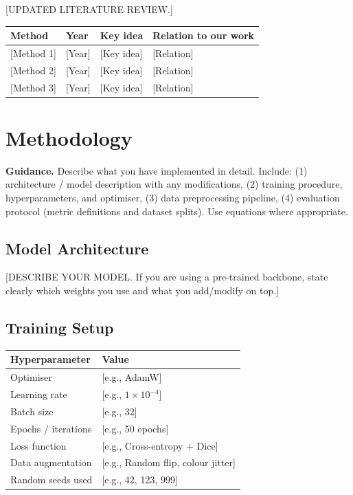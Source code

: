 \documentclass[11pt, letterpaper]{article}
\begin{document}
[UPDATED LITERATURE REVIEW.]

\begin{center}
\begin{tabular}{llp{4cm}p{4cm}}
\toprule
\textbf{Method} & \textbf{Year} & \textbf{Key idea} & \textbf{Relation to our work} \\
\midrule
{[Method 1]} & [Year] & [Key idea] & [Relation] \\
{[Method 2]} & [Year] & [Key idea] & [Relation] \\
{[Method 3] }& [Year] & [Key idea] & [Relation] \\
\bottomrule
\end{tabular}
\end{center}

\section{Methodology}

\begin{guidancebox}
\textbf{Guidance.} Describe what you have implemented in detail. Include:
(1) architecture / model description with any modifications,
(2) training procedure, hyperparameters, and optimiser,
(3) data preprocessing pipeline,
(4) evaluation protocol (metric definitions and dataset splits).
Use equations where appropriate.
\end{guidancebox}

\subsection{Model Architecture}

[DESCRIBE YOUR MODEL. If you are using a pre-trained backbone, state clearly
which weights you use and what you add/modify on top.]

\subsection{Training Setup}

\begin{tabular}{ll}
\toprule
\textbf{Hyperparameter} & \textbf{Value} \\
\midrule
Optimiser & [e.g., AdamW] \\
Learning rate & [e.g., $1\times10^{-4}$] \\
Batch size & [e.g., 32] \\
Epochs / iterations & [e.g., 50 epochs] \\
Loss function & [e.g., Cross-entropy + Dice] \\
Data augmentation & [e.g., Random flip, colour jitter] \\
Random seeds used & [e.g., 42, 123, 999] \\
\bottomrule
\end{tabular}
\end{document}
